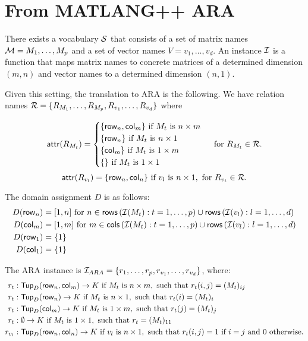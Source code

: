 \newcommand{\row}{\mathsf{row}}
\newcommand{\rows}{\mathsf{rows}}
\newcommand{\col}{\mathsf{col}}
\newcommand{\cols}{\mathsf{cols}}

\section{From MATLANG++ ARA}

There exists a vocabulary $\mathcal{S}$ that consists of a set of matrix names $\mathcal{M}=M_1,\ldots, M_p$ and a set of vector names $V=v_1,\ldots, v_d$. An instance $\mathcal{I}$ is a function that maps matrix names to concrete matrices of a determined dimension $(m,n)$ and vector names to a determined dimension $(n, 1)$.

Given this setting, the translation to ARA is the following. We have relation names $ \mathcal{R}=\lbrace R_{M_1}, \ldots, R_{M_p}, R_{v_1}, \ldots, R_{v_d}\rbrace$ where 

\[
	\attr{R_{M_t}} = \begin{cases}
		\lbrace\row_n,\col_m \rbrace \text{ if } M_t \text{ is } n\times m \\
		\lbrace\row_n \rbrace \text{ if } M_t \text{ is } n\times 1 \\
		\lbrace\col_m \rbrace \text{ if } M_t \text{ is } 1\times m \\
		\lbrace\rbrace \text{ if } M_t \text{ is } 1\times 1 \\
	\end{cases} \text{ for } R_{M_t}\in\cR.
\]
$$\attr{R_{v_l}} = \lbrace\row_n,\col_n \rbrace \text{ if } v_l \text{ is } n\times 1, \text{ for } R_{v_t}\in\cR.$$

The domain assignment $D$ is as follows:
\begin{align*}
	D(\row_n)&=[1, n]\text{ for } n\in\rows\left( \cI(M_t): t=1,\ldots, p\right)\cup\rows\left( \cI(v_l): l=1,\ldots, d\right) \\
	D(\col_m)&=[1, m]\text{ for } m\in\cols\left( \cI(M_t): t=1,\ldots, p\right)\cup\rows\left( \cI(v_l): l=1,\ldots, d\right) \\
	D(\row_1) &=\lbrace 1\rbrace \\
	D(\col_1) &=\lbrace 1\rbrace
\end{align*}

The ARA instance is $\mathcal{I}_{ARA}=\lbrace r_1,\ldots,r_p,r_{v_1},\ldots, r_{v_d}\rbrace$, where:
\begin{align*}
r_t&: \Tup_D(\row_n,\col_m)\rightarrow K \text{ if }  M_t \text{ is } n\times m, \text{ such that } r_t(i,j)=(M_t)_{ij} \\
r_t&: \Tup_D(\row_n)\rightarrow K \text{ if }  M_t \text{ is } n\times 1, \text{ such that } r_t(i)=(M_t)_{i} \\
r_t&: \Tup_D(\col_m)\rightarrow K \text{ if }  M_t \text{ is } 1\times m, \text{ such that } r_t(j)=(M_t)_{j} \\
r_t&: \emptyset\rightarrow K \text{ if }  M_t \text{ is } 1\times 1, \text{ such that } r_t=(M_t)_{11} \\
r_{v_l}&: \Tup_D(\row_n,\col_n)\rightarrow K \text{ if }  v_l \text{ is } n\times 1, \text{ such that } r_t(i,j)=1 \text{ if } i=j \text{ and } 0 \text{ otherwise.}
\end{align*}

